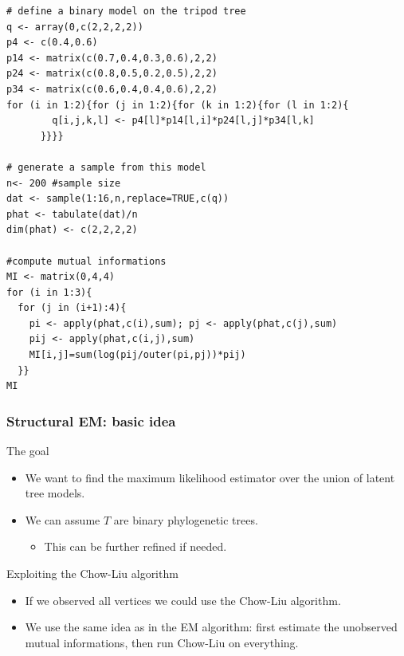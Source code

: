 \documentclass[dvipsnames,aspectratio=169]{beamer} %
\begin{document}
\begin{frame}[fragile]{}
	\begin{lstlisting}
# define a binary model on the tripod tree
q <- array(0,c(2,2,2,2))
p4 <- c(0.4,0.6)
p14 <- matrix(c(0.7,0.4,0.3,0.6),2,2)
p24 <- matrix(c(0.8,0.5,0.2,0.5),2,2)
p34 <- matrix(c(0.6,0.4,0.4,0.6),2,2)
for (i in 1:2){for (j in 1:2){for (k in 1:2){for (l in 1:2){
        q[i,j,k,l] <- p4[l]*p14[l,i]*p24[l,j]*p34[l,k]
      }}}}

# generate a sample from this model
n<- 200 #sample size
dat <- sample(1:16,n,replace=TRUE,c(q))
phat <- tabulate(dat)/n
dim(phat) <- c(2,2,2,2)

#compute mutual informations
MI <- matrix(0,4,4)
for (i in 1:3){
  for (j in (i+1):4){
    pi <- apply(phat,c(i),sum); pj <- apply(phat,c(j),sum)
    pij <- apply(phat,c(i,j),sum)
    MI[i,j]=sum(log(pij/outer(pi,pj))*pij)
  }}
MI
	\end{lstlisting}
\end{frame}




\begin{frame}
	\frametitle{Structural EM: basic idea}
\begin{alertblock}{The goal}
\begin{itemize}
\item We want to find the maximum likelihood estimator over the union of latent tree models. 
\item We can assume $T$ are binary phylogenetic trees.
\begin{itemize}
\item This can be further refined if needed.
\end{itemize}
\end{itemize}
\end{alertblock}
\bigskip
\begin{alertblock}{Exploiting the Chow-Liu algorithm}
\begin{itemize}
\item If we observed all vertices we could use the Chow-Liu algorithm.
\item We use the same idea as in the EM algorithm: first estimate the unobserved mutual informations, then run Chow-Liu on everything.
\end{itemize}
\end{alertblock}
\end{frame}
\end{document}
